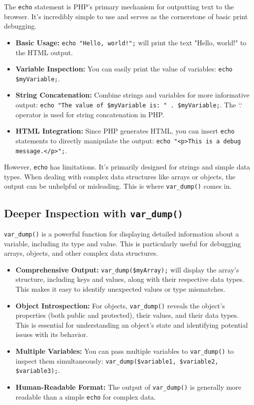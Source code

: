 \documentclass{article}
\begin{document}
{{{{The \texttt{echo} statement is PHP's primary mechanism for outputting text to the browser. It's incredibly simple to use and serves as the cornerstone of basic print debugging.

\begin{itemize}
    \item \textbf{Basic Usage:} \texttt{echo "Hello, world!";} will print the text "Hello, world!" to the HTML output.
    \item \textbf{Variable Inspection:} You can easily print the value of variables: \texttt{echo \$myVariable;}.
    \item \textbf{String Concatenation:} Combine strings and variables for more informative output: \texttt{echo "The value of \$myVariable is: " . \$myVariable;}.  The `.` operator is used for string concatenation in PHP.
    \item \textbf{HTML Integration:}  Since PHP generates HTML, you can insert \texttt{echo} statements to directly manipulate the output: \texttt{echo "<p>This is a debug message.</p>";}.
\end{itemize}

However, \texttt{echo} has limitations. It's primarily designed for strings and simple data types. When dealing with complex data structures like arrays or objects, the output can be unhelpful or misleading. This is where \texttt{var\_dump()} comes in.

\subsection*{Deeper Inspection with \texttt{var\_dump()}}

\texttt{var\_dump()} is a powerful function for displaying detailed information about a variable, including its type and value. This is particularly useful for debugging arrays, objects, and other complex data structures.

\begin{itemize}
    \item \textbf{Comprehensive Output:} \texttt{var\_dump(\$myArray);} will display the array's structure, including keys and values, along with their respective data types. This makes it easy to identify unexpected values or type mismatches.
    \item \textbf{Object Introspection:}  For objects, \texttt{var\_dump()} reveals the object's properties (both public and protected), their values, and their data types. This is essential for understanding an object's state and identifying potential issues with its behavior.
    \item \textbf{Multiple Variables:}  You can pass multiple variables to \texttt{var\_dump()} to inspect them simultaneously: \texttt{var\_dump(\$variable1, \$variable2, \$variable3);}.
    \item \textbf{Human-Readable Format:} The output of \texttt{var\_dump()} is generally more readable than a simple \texttt{echo} for complex data.
\end{itemize}

}}}}
\end{document}
